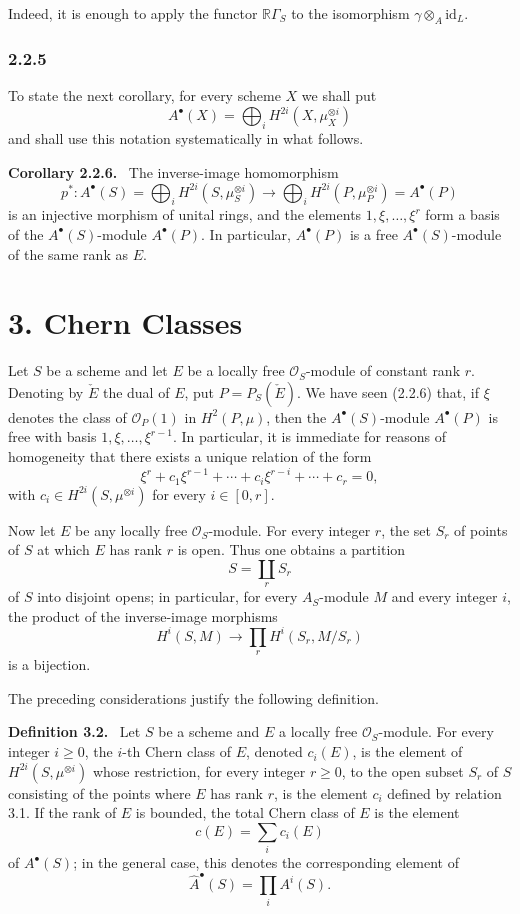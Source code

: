 \documentclass[11pt]{article}
\newenvironment{statement}[1]{\par\medskip\noindent\textbf{#1.}\ }{\par\medskip}
\begin{document}
Indeed, it is enough to apply the functor $\mathbb{R}\Gamma_S$ to the isomorphism $\gamma\otimes_A\mathrm{id}_L$.

\subsubsection*{2.2.5}
To state the next corollary, for every scheme $X$ we shall put
\[
A^\bullet(X)=\bigoplus_i H^{2i}(X,\mu_X^{\otimes i})
\]
and shall use this notation systematically in what follows.

\begin{statement}{Corollary 2.2.6}
The inverse-image homomorphism
\[
p^*:A^\bullet(S)=\bigoplus_i H^{2i}(S,\mu_S^{\otimes i})
\longrightarrow
\bigoplus_i H^{2i}(P,\mu_P^{\otimes i})=A^\bullet(P)
\]
is an injective morphism of unital rings, and the elements $1,\xi,\ldots,\xi^r$ form a basis of the $A^\bullet(S)$-module $A^\bullet(P)$. In particular, $A^\bullet(P)$ is a free $A^\bullet(S)$-module of the same rank as $E$.
\end{statement}

\section*{3. Chern Classes}

Let $S$ be a scheme and let $E$ be a locally free $\mathcal O_S$-module of constant rank $r$. Denoting by $\check E$ the dual of $E$, put $P=P_S(\check E)$. We have seen (2.2.6) that, if $\xi$ denotes the class of $\mathcal O_P(1)$ in $H^2(P,\mu)$, then the $A^\bullet(S)$-module $A^\bullet(P)$ is free with basis $1,\xi,\ldots,\xi^{r-1}$. In particular, it is immediate for reasons of homogeneity that there exists a unique relation of the form
\[
\xi^r+c_1\xi^{r-1}+\cdots+c_i\xi^{r-i}+\cdots+c_r=0,
\tag{3.1}
\]
with $c_i\in H^{2i}(S,\mu^{\otimes i})$ for every $i\in[0,r]$.

Now let $E$ be any locally free $\mathcal O_S$-module. For every integer $r$, the set $S_r$ of points of $S$ at which $E$ has rank $r$ is open. Thus one obtains a partition
\[
S=\coprod_r S_r
\]
of $S$ into disjoint opens; in particular, for every $A_S$-module $M$ and every integer $i$, the product of the inverse-image morphisms
\[
H^i(S,M)\longrightarrow \prod_r H^i(S_r,M/S_r)
\]
is a bijection.

The preceding considerations justify the following definition.

\begin{statement}{Definition 3.2}
Let $S$ be a scheme and $E$ a locally free $\mathcal O_S$-module. For every integer $i\ge0$, the $i$-th Chern class of $E$, denoted $c_i(E)$, is the element of $H^{2i}(S,\mu^{\otimes i})$ whose restriction, for every integer $r\ge0$, to the open subset $S_r$ of $S$ consisting of the points where $E$ has rank $r$, is the element $c_i$ defined by relation 3.1. If the rank of $E$ is bounded, the total Chern class of $E$ is the element
\[
c(E)=\sum_i c_i(E)
\]
of $A^\bullet(S)$; in the general case, this denotes the corresponding element of
\[
\widehat A^{\bullet}(S)=\prod_i A^i(S).
\]
\end{statement}
\end{document}
